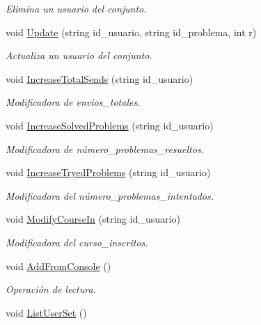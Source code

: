 \begin{DoxyCompactItemize}
\begin{DoxyCompactList}\small\item\em Elimina un usuario del conjunto. \end{DoxyCompactList}\item 
void \mbox{\hyperlink{class_user_set_aff81874263edfa786d5bf6f4f17c0425}{Update}} (string id\+\_\+usuario, string id\+\_\+problema, int r)
\begin{DoxyCompactList}\small\item\em Actualiza un usuario del conjunto. \end{DoxyCompactList}\item 
void \mbox{\hyperlink{class_user_set_a967c4fc4280fecb741abe4c9dc08cb59}{Increase\+Total\+Sends}} (string id\+\_\+usuario)
\begin{DoxyCompactList}\small\item\em Modificadora de envios\+\_\+totales. \end{DoxyCompactList}\item 
void \mbox{\hyperlink{class_user_set_a7462310142b0f573b51708d9eb7ead56}{Increase\+Solved\+Problems}} (string id\+\_\+usuario)
\begin{DoxyCompactList}\small\item\em Modificadora de número\+\_\+problemas\+\_\+resueltos. \end{DoxyCompactList}\item 
void \mbox{\hyperlink{class_user_set_aaba14c5d99e15bc568bf6985e77c85af}{Increase\+Tryed\+Problems}} (string id\+\_\+usuario)
\begin{DoxyCompactList}\small\item\em Modificadora del número\+\_\+problemas\+\_\+intentados. \end{DoxyCompactList}\item 
void \mbox{\hyperlink{class_user_set_af618063be593ccc2c3605a7d75773437}{Modify\+Course\+In}} (string id\+\_\+usuario)
\begin{DoxyCompactList}\small\item\em Modificadora del curso\+\_\+inscritos. \end{DoxyCompactList}\item 
void \mbox{\hyperlink{class_user_set_a4618efff11bc85371b754ee58e138ba4}{Add\+From\+Console}} ()
\begin{DoxyCompactList}\small\item\em Operación de lectura. \end{DoxyCompactList}\item 
void \mbox{\hyperlink{class_user_set_a0d096b2eec4c9b5feb4a1d7c8e6d3ef6}{List\+User\+Set}} ()

\end{DoxyCompactItemize}

